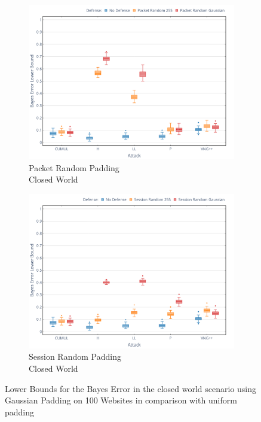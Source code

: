 \documentclass[
	ruledheaders=chapter,
	class=report,
	thesis={type=master, department=inf},
	accentcolor=1c,
	custommargins=true,
	marginpar=false,
	parskip=half-,
	fontsize=11pt,
]{tudapub}
\begin{document}
	\begin{figure}
		\begin{subfigure}{0.495\textwidth}
			\centering
			\includegraphics[width=\textwidth]{plots/bounds_cw_pkt.png}
			\caption{Packet Random Padding\\Closed World}
		\end{subfigure}
		\hfill
		\begin{subfigure}{0.495\textwidth}
			\centering
			\includegraphics[width=\textwidth]{plots/bounds_cw_ses.png}
			\caption{Session Random Padding\\Closed World}
		\end{subfigure}
		\caption[Lower Bounds for the Bayes Error in the closed world scenario]{Lower Bounds for the Bayes Error in the closed world scenario using Gaussian Padding on 100 Websites in comparison with uniform padding}
		\label{fig:bound_cw}
	\end{figure}
\end{document}
